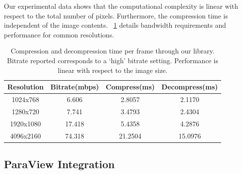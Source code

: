 \documentclass[review]{vgtc}                 %
\begin{document}

Our experimental data shows that the computational complexity is
linear with respect to the total number of pixels.  Furthermore, the
compression time is independent of the image contents.
~\cref{tab:experiment_setup} details bandwidth requirements and
performance for common resolutions.


%

\begin{table}[h]
  \caption{Compression and decompression time per frame through our
  library.  Bitrate reported corresponds to a `high' bitrate setting.
  Performance is linear with respect to the image size.}
  \label{tab:experiment_setup}
  \scriptsize
  \begin{center}
    \begin{tabular}{cccc}
      Resolution & Bitrate(mbps) & Compress(ms) & Decompress(ms)\\
    \hline
      1024x768 & 6.606 & 2.8057 & 2.1170\\
      1280x720 & 7.741 & 3.4793 & 2.4304\\
      1920x1080 & 17.418 & 5.4358 & 4.2876\\
      4096x2160 & 74.318 & 21.2504 & 15.0976
    \end{tabular}
  \end{center}
\end{table}

\subsection{ParaView Integration}
\end{document}
